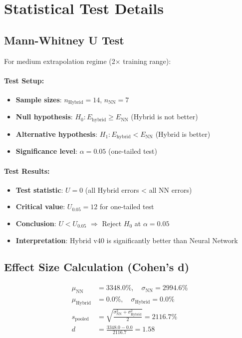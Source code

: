 \documentclass[twoside,11pt]{article}
\begin{document}

\section{Statistical Test Details}
\label{app:statistical_tests}

\subsection{Mann-Whitney U Test}

For medium extrapolation regime (2$\times$ training range):

\paragraph{Test Setup:}
\begin{itemize}
\item \textbf{Sample sizes}: $n_{\text{Hybrid}} = 14$, $n_{\text{NN}} = 7$
\item \textbf{Null hypothesis}: $H_0: E_{\text{hybrid}} \geq E_{\text{NN}}$ (Hybrid is not better)
\item \textbf{Alternative hypothesis}: $H_1: E_{\text{hybrid}} < E_{\text{NN}}$ (Hybrid is better)
\item \textbf{Significance level}: $\alpha = 0.05$ (one-tailed test)
\end{itemize}

\paragraph{Test Results:}
\begin{itemize}
\item \textbf{Test statistic}: $U = 0$ (all Hybrid errors < all NN errors)
\item \textbf{Critical value}: $U_{0.05} = 12$ for one-tailed test
\item \textbf{Conclusion}: $U < U_{0.05}$ $\Rightarrow$ Reject $H_0$ at $\alpha = 0.05$
\item \textbf{Interpretation}: Hybrid v40 is significantly better than Neural Network
\end{itemize}

\subsection{Effect Size Calculation (Cohen's d)}

\begin{align}
\mu_{\text{NN}} &= 3348.0\%, \quad \sigma_{\text{NN}} = 2994.6\% \\
\mu_{\text{Hybrid}} &= 0.0\%, \quad \sigma_{\text{Hybrid}} = 0.0\% \\
s_{\text{pooled}} &= \sqrt{\frac{\sigma_{\text{NN}}^2 + \sigma_{\text{Hybrid}}^2}{2}} = 2116.7\% \\
d &= \frac{3348.0 - 0.0}{2116.7} = 1.58
\end{align}
\end{document}
